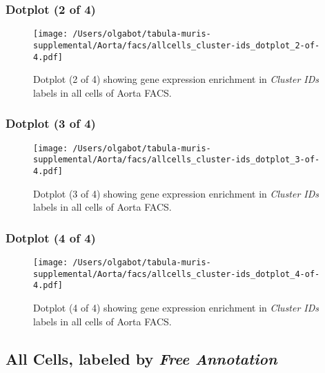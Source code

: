 \clearpage

\subsubsection{Dotplot (2 of 4)}
\begin{figure}[h]
\centering
\texttt{[image: /Users/olgabot/tabula-muris-supplemental/Aorta/facs/allcells\_cluster-ids\_dotplot\_2-of-4.pdf]}

\caption{ Dotplot (2 of 4)  showing gene expression enrichment in \emph{Cluster IDs} labels in all cells of Aorta FACS. }
\end{figure}


\clearpage

\subsubsection{Dotplot (3 of 4)}
\begin{figure}[h]
\centering
\texttt{[image: /Users/olgabot/tabula-muris-supplemental/Aorta/facs/allcells\_cluster-ids\_dotplot\_3-of-4.pdf]}

\caption{ Dotplot (3 of 4)  showing gene expression enrichment in \emph{Cluster IDs} labels in all cells of Aorta FACS. }
\end{figure}


\clearpage

\subsubsection{Dotplot (4 of 4)}
\begin{figure}[h]
\centering
\texttt{[image: /Users/olgabot/tabula-muris-supplemental/Aorta/facs/allcells\_cluster-ids\_dotplot\_4-of-4.pdf]}

\caption{ Dotplot (4 of 4)  showing gene expression enrichment in \emph{Cluster IDs} labels in all cells of Aorta FACS. }
\end{figure}


\clearpage

\subsection{All Cells, labeled by \emph{Free Annotation}}
